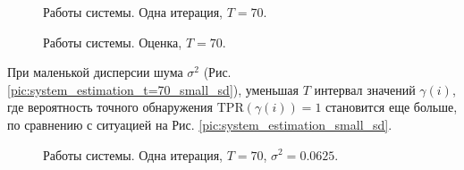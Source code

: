 \documentclass[specialist, substylefile = spbu.rtx,
			   subf, href, 12pt]{disser}
\begin{document}
\begin{figure}[!hhh]
	\caption{Работы системы. Одна итерация, $ T = 70 $.}
	\label{pic:system_estimation_one_iter_t=70}
\end{figure}

\begin{figure}[!hhh]
	\caption{Работы системы. Оценка, $ T = 70 $.}
	\label{pic:system_estimation_t=70}
\end{figure}

\newpage
При маленькой дисперсии шума $ \sigma^2 $ (Рис. \ref{pic:system_estimation_t=70_small_sd}), уменьшая $ T $ интервал значений $ \gamma(i) $, где вероятность точного обнаружения $ \mathrm{TPR}(\gamma(i)) = 1 $ становится еще больше, по сравнению с ситуацией на Рис. \ref{pic:system_estimation_small_sd}.

\begin{figure}[!hhh]
	\caption{Работы системы. Одна итерация, $ T = 70 $, $ \sigma^2=0.0625 $.}
	\label{pic:system_estimation_one_iter_t=70_small_sd}
\end{figure}
\end{document}

